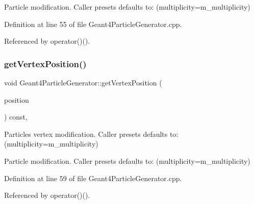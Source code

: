 Particle modification. Caller presets defaults to\+: (multiplicity=m\+\_\+multiplicity) 



Definition at line 55 of file Geant4\+Particle\+Generator.\+cpp.



Referenced by operator()().

\hypertarget{class_d_d4hep_1_1_simulation_1_1_geant4_particle_generator_a32606cece5c3e45ca810aabd5909d442}{}\label{class_d_d4hep_1_1_simulation_1_1_geant4_particle_generator_a32606cece5c3e45ca810aabd5909d442} 
\subsubsection{\texorpdfstring{get\+Vertex\+Position()}{getVertexPosition()}}
{\footnotesize\ttfamily void Geant4\+Particle\+Generator\+::get\+Vertex\+Position (\begin{DoxyParamCaption}\item[{R\+O\+O\+T\+::\+Math\+::\+X\+Y\+Z\+Vector \&}]{position }\end{DoxyParamCaption}) const\hspace{0.3cm}{\ttfamily [protected]}, {\ttfamily [virtual]}}



Particle\textquotesingle{}s vertex modification. Caller presets defaults to\+: (multiplicity=m\+\_\+multiplicity) 

Particle modification. Caller presets defaults to\+: (multiplicity=m\+\_\+multiplicity) 

Definition at line 59 of file Geant4\+Particle\+Generator.\+cpp.



Referenced by operator()().

\hypertarget{class_d_d4hep_1_1_simulation_1_1_geant4_particle_generator_a4b7c8fdbc6fdc0c79efdf112c8ede315}{}\label{class_d_d4hep_1_1_simulation_1_1_geant4_particle_generator_a4b7c8fdbc6fdc0c79efdf112c8ede315} 
